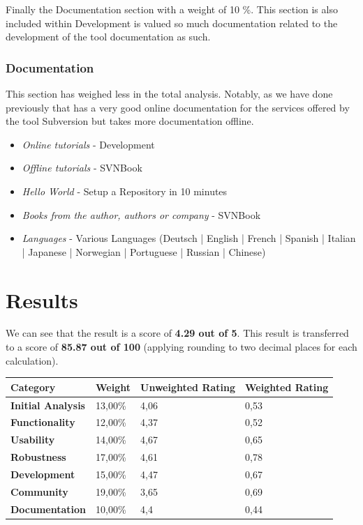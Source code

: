\documentclass[11pt]{scrartcl}
\begin{document}
\par Finally the Documentation section with a weight of 10 \%. This section is also included within Development is valued so much documentation related to the development of the tool documentation as such.

\subsubsection{Documentation}

\par This section has weighed less in the total analysis. Notably, as we have done previously that has a very good online documentation for the services offered by the tool Subversion but takes more documentation offline.

\begin{itemize}
    \item \emph{Online tutorials} - Development
    \item \emph{Offline tutorials} - SVNBook
    \item \emph{Hello World} - Setup a Repository in 10 minutes
    \item \emph{Books from the author, authors or company} - SVNBook
    \item \emph{Languages} - Various Languages (Deutsch | English | French | Spanish | Italian | Japanese | Norwegian | Portuguese | Russian | Chinese)
\end{itemize}

\section{Results}

We can see that the result is a score of \textbf{4.29 out of 5}. This result is transferred to a score of \textbf{85.87 out of 100} (applying rounding to two decimal places for each calculation).

\begin{tabular}{|l|l|l|l|}
    \hline {\bf Category} & {\bf Weight} & {\bf Unweighted Rating} & {\bf Weighted Rating}\\
    \hline {\bf Initial Analysis}	 & 13,00\% & 4,06 & 0,53 \\
    \hline {\bf Functionality} & 12,00\% & 4,37 & 0,52\\
    \hline {\bf Usability} & 14,00\% & 4,67 & 0,65\\
    \hline {\bf Robustness} & 17,00\% & 4,61 & 0,78\\
    \hline {\bf Development} & 15,00\% & 4,47 & 0,67\\
    \hline {\bf Community} & 19,00\% & 3,65 & 0,69\\
    \hline {\bf Documentation} & 10,00\% & 4,4 & 0,44\\
    \hline
\end{tabular}
\end{document}
